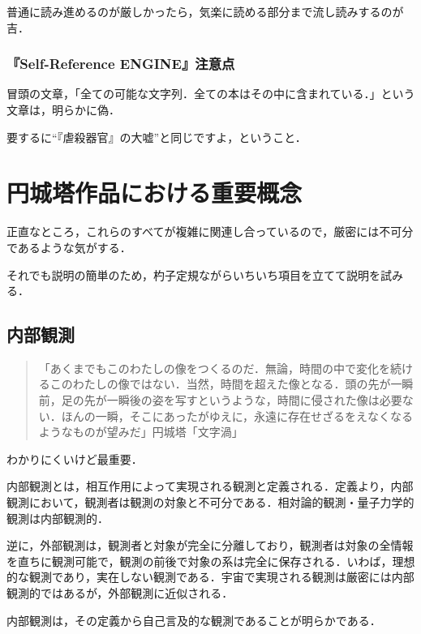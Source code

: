 \documentclass[10pt, a5paper, twoside]{jsarticle}
\begin{document}
				普通に読み進めるのが厳しかったら，気楽に読める部分まで流し読みするのが吉．

			\subsubsection*{『Self-Reference ENGINE』注意点}

				冒頭の文章，「全ての可能な文字列．全ての本はその中に含まれている．」という文章は，明らかに偽．

				要するに“『虐殺器官』の大嘘”と同じですよ，ということ．

	\section{円城塔作品における重要概念}

			正直なところ，これらのすべてが複雑に関連し合っているので，厳密には不可分であるような気がする．

			それでも説明の簡単のため，杓子定規ながらいちいち項目を立てて説明を試みる．

		\subsection{内部観測}

			\begin{quote}

				「あくまでもこのわたしの像をつくるのだ．無論，時間の中で変化を続けるこのわたしの像ではない．当然，時間を超えた像となる．頭の先が一瞬前，足の先が一瞬後の姿を写すというような，時間に侵された像は必要ない．ほんの一瞬，そこにあったがゆえに，永遠に存在せざるをえなくなるようなものが望みだ」\hspace{\fill}円城塔「文字渦」

			\end{quote}

			わかりにくいけど最重要．

			内部観測とは，相互作用によって実現される観測と定義される．定義より，内部観測において，観測者は観測の対象と不可分である．相対論的観測・量子力学的観測は内部観測的．

			逆に，外部観測は，観測者と対象が完全に分離しており，観測者は対象の全情報を直ちに観測可能で，観測の前後で対象の系は完全に保存される．いわば，理想的な観測であり，実在しない観測である．宇宙で実現される観測は厳密には内部観測的ではあるが，外部観測に近似される．

			内部観測は，その定義から自己言及的な観測であることが明らかである．
\end{document}
